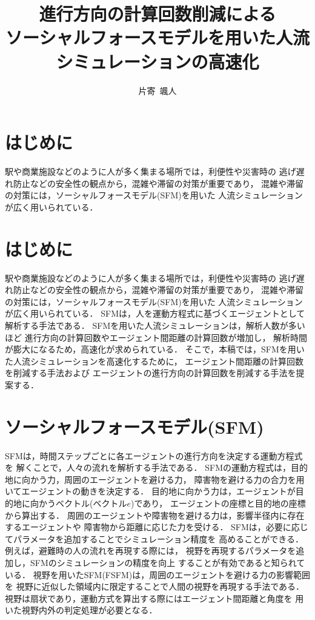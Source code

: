 \documentclass{maelab_y}
\begin{document}
\title{進行方向の計算回数削減による
\\ソーシャルフォースモデルを用いた人流シミュレーションの高速化}
\author{片寄\ 颯人}
\maketitle

\section{はじめに}
駅や商業施設などのように人が多く集まる場所では，利便性や災害時の
逃げ遅れ防止などの安全性の観点から，混雑や滞留の対策が重要であり，
混雑や滞留の対策には，ソーシャルフォースモデル(SFM)を用いた
人流シミュレーションが広く用いられている\cite{helbing_sfm}．


\section{はじめに}
駅や商業施設などのように人が多く集まる場所では，利便性や災害時の
逃げ遅れ防止などの安全性の観点から，混雑や滞留の対策が重要であり，
混雑や滞留の対策には，ソーシャルフォースモデル(SFM)を用いた
人流シミュレーションが広く用いられている\cite{helbing_sfm}．
SFMは，人を運動方程式に基づくエージェントとして解析する手法である．
SFMを用いた人流シミュレーションは，解析人数が多いほど	
進行方向の計算回数やエージェント間距離の計算回数が増加し，
解析時間が膨大になるため，高速化が求められている．
そこで，本稿では，SFMを用いた人流シミュレーションを高速化するために，
エージェント間距離の計算回数を削減する手法および
エージェントの進行方向の計算回数を削減する手法を提案する．

\section{ソーシャルフォースモデル(SFM)}
SFMは，時間ステップごとに各エージェントの進行方向を決定する運動方程式を
解くことで，人々の流れを解析する手法である．
SFMの運動方程式は，目的地に向かう力，周囲のエージェントを避ける力，
障害物を避ける力の合力を用いてエージェントの動きを決定する．
目的地に向かう力は，エージェントが目的地に向かうベクトル(ベクトル$e$)であり，
エージェントの座標と目的地の座標から算出する．
周囲のエージェントや障害物を避ける力は，影響半径内に存在するエージェントや
障害物から距離に応じた力を受ける．
SFMは，必要に応じてパラメータを追加することでシミュレーション精度を
高めることができる．例えば，避難時の人の流れを再現する際には，
視野を再現するパラメータを追加し，SFMのシミュレーションの精度を向上
することが有効であると知られている\cite{21_Isozaki}．
視野を用いたSFM(FSFM)は，周囲のエージェントを避ける力の影響範囲を
視野に近似した領域内に限定することで人間の視野を再現する手法である．
視野は扇状であり，運動方式を算出する際にはエージェント間距離と角度を
用いた視野内外の判定処理が必要となる．
\end{document}
